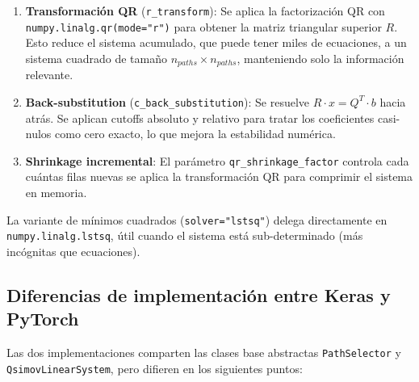 \begin{enumerate}
  \item \textbf{Transformación QR} (\texttt{r\_transform}): Se aplica la factorización QR con
        \texttt{numpy.linalg.qr(mode="r")} para obtener la matriz triangular superior $R$. Esto
        reduce el sistema acumulado, que puede tener miles de ecuaciones, a un sistema cuadrado
        de tamaño $n_{paths} \times n_{paths}$, manteniendo solo la información relevante.
  \item \textbf{Back-substitution} (\texttt{c\_back\_substitution}): Se resuelve
        $R \cdot x = Q^T \cdot b$ hacia atrás. Se aplican cutoffs absoluto y relativo para tratar
        los coeficientes casi-nulos como cero exacto, lo que mejora la estabilidad numérica.
  \item \textbf{Shrinkage incremental}: El parámetro \texttt{qr\_shrinkage\_factor} controla cada
        cuántas filas nuevas se aplica la transformación QR para comprimir el sistema en memoria.
\end{enumerate}

La variante de mínimos cuadrados (\texttt{solver="lstsq"}) delega directamente en
\texttt{numpy.linalg.lstsq}, útil cuando el sistema está sub-determinado (más incógnitas que
ecuaciones).

\subsection{Diferencias de implementación entre Keras y PyTorch}

Las dos implementaciones comparten las clases base abstractas \texttt{PathSelector} y
\texttt{QsimovLinearSystem}, pero difieren en los siguientes puntos:

